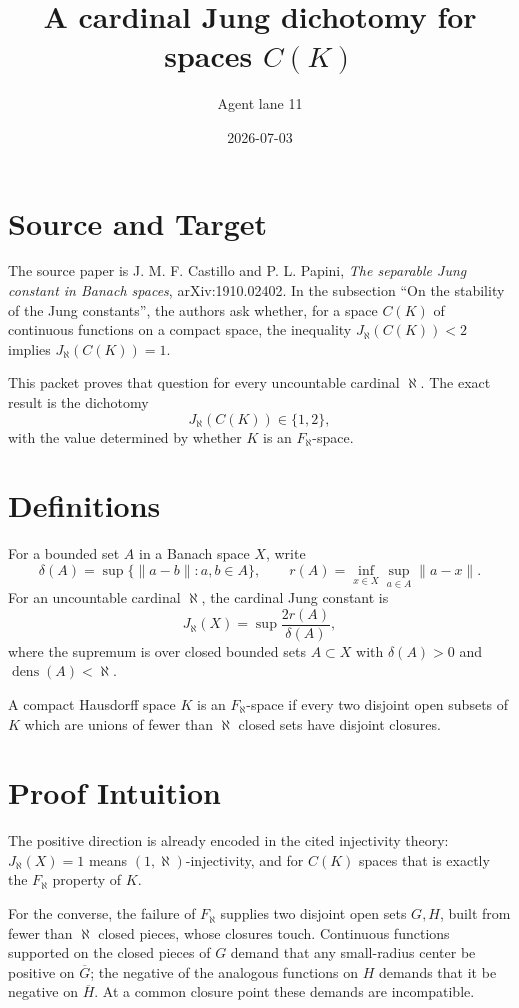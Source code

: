 \documentclass[11pt]{article}
\title{A cardinal Jung dichotomy for spaces \(C(K)\)}
\author{Agent lane 11}
\date{2026-07-03}
\newcommand{\dens}{\operatorname{dens}}
\begin{document}
\maketitle

\section*{Source and Target}

The source paper is J. M. F. Castillo and P. L. Papini,
\emph{The separable Jung constant in Banach spaces}, arXiv:1910.02402.
In the subsection ``On the stability of the Jung constants'', the authors
ask whether, for a space \(C(K)\) of continuous functions on a compact
space, the inequality \(J_{\aleph}(C(K))<2\) implies
\(J_{\aleph}(C(K))=1\).

This packet proves that question for every uncountable cardinal \(\aleph\).
The exact result is the dichotomy
\[
        J_{\aleph}(C(K))\in\{1,2\},
\]
with the value determined by whether \(K\) is an \(F_{\aleph}\)-space.

\section*{Definitions}

For a bounded set \(A\) in a Banach space \(X\), write
\[
 \delta(A)=\sup\{\|a-b\|:a,b\in A\},\qquad
 r(A)=\inf_{x\in X}\sup_{a\in A}\|a-x\|.
\]
For an uncountable cardinal \(\aleph\), the cardinal Jung constant is
\[
 J_{\aleph}(X)=\sup \frac{2r(A)}{\delta(A)},
\]
where the supremum is over closed bounded sets \(A\subset X\) with
\(\delta(A)>0\) and \(\dens(A)<\aleph\).

A compact Hausdorff space \(K\) is an \(F_{\aleph}\)-space if every two
disjoint open subsets of \(K\) which are unions of fewer than \(\aleph\)
closed sets have disjoint closures.

\section*{Proof Intuition}

The positive direction is already encoded in the cited injectivity theory:
\(J_{\aleph}(X)=1\) means \((1,\aleph)\)-injectivity, and for \(C(K)\)
spaces that is exactly the \(F_{\aleph}\) property of \(K\).

For the converse, the failure of \(F_{\aleph}\) supplies two disjoint open
sets \(G,H\), built from fewer than \(\aleph\) closed pieces, whose closures
touch. Continuous functions supported on the closed pieces of \(G\) demand
that any small-radius center be positive on \(\overline G\); the negative
of the analogous functions on \(H\) demands that it be negative on
\(\overline H\). At a common closure point these demands are incompatible.
\end{document}
